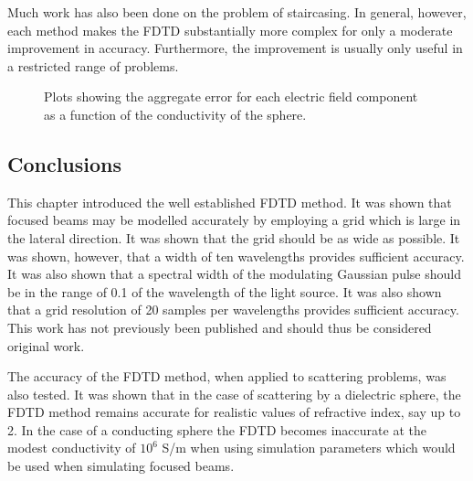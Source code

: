 \documentclass[a4paper, 12pt]{article}
\begin{document}
	Much work has also been done on the problem of staircasing. In
	general, however, each method makes the FDTD substantially more complex for
	only a moderate improvement in accuracy. Furthermore, the improvement
	is usually only useful in a restricted range of problems. 
	\begin{figure}[!h]
		\begin{center}
			\caption{Plots showing the aggregate error for each electric field
				component as a function of the conductivity of the sphere.}
			\label{fig:fdtd:cond}
		\end{center}
	\end{figure}
	\subsection{Conclusions}
	This chapter introduced the well established FDTD method. It was shown
	that focused beams may be modelled accurately by employing a grid
	which is large in the lateral direction. It was shown that the grid
	should be as wide as possible. It was shown, however, that a width of ten
	wavelengths provides sufficient accuracy. It was also shown that a
	spectral width of the modulating Gaussian pulse should be in the range
	of 0.1 of the wavelength of the light source. It was also shown that a
	grid resolution of 20 samples per wavelengths provides sufficient
	accuracy. This work has not previously been published and should thus
	be considered original work.
	
	The accuracy of the FDTD method, when applied to scattering problems,
	was also tested. It was shown that in the case of scattering by a
	dielectric sphere, the FDTD method remains accurate for realistic
	values of refractive index, say up to 2. In the case of a conducting sphere the
	FDTD becomes inaccurate at the modest conductivity of $10^6$ S/m when
	using simulation parameters which would be used when simulating
	focused beams. 
	
\end{document}
